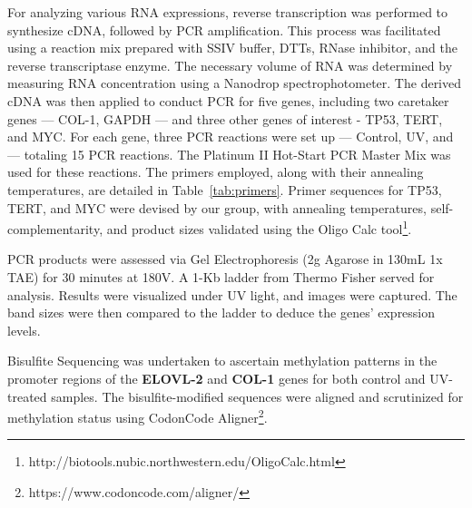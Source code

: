 \documentclass[letterpaper,11pt]{article}
\begin{document}
For analyzing various RNA expressions, reverse transcription was performed to synthesize cDNA, followed by PCR amplification. This process was facilitated using a reaction mix prepared with SSIV buffer, DTTs, RNase inhibitor, and the reverse transcriptase enzyme. The necessary volume of RNA was determined by measuring RNA concentration using a Nanodrop spectrophotometer. The derived cDNA was then applied to conduct PCR for five genes, including two caretaker genes — COL-1, GAPDH — and three other genes of interest - TP53, TERT, and MYC. For each gene, three PCR reactions were set up — Control, UV, and  — totaling 15 PCR reactions. The Platinum II Hot-Start PCR Master Mix was used for these reactions. The primers employed, along with their annealing temperatures, are detailed in Table~\ref{tab:primers}. Primer sequences for TP53, TERT, and MYC were devised by our group, with annealing temperatures, self-complementarity, and product sizes validated using the Oligo Calc tool\footnote{http://biotools.nubic.northwestern.edu/OligoCalc.html}.

PCR products were assessed via Gel Electrophoresis (2g Agarose in 130mL 1x TAE) for 30 minutes at 180V. A 1-Kb ladder from Thermo Fisher served for analysis. Results were visualized under UV light, and images were captured. The band sizes were then compared to the ladder to deduce the genes' expression levels.

Bisulfite Sequencing was undertaken to ascertain methylation patterns in the promoter regions of the \textbf{ELOVL-2} and \textbf{COL-1} genes for both control and UV-treated samples. The bisulfite-modified sequences were aligned and scrutinized for methylation status using CodonCode Aligner\footnote{https://www.codoncode.com/aligner/}.
\end{document}
